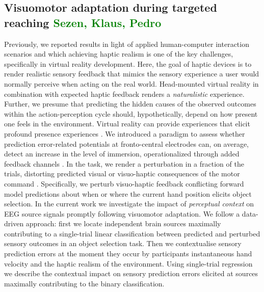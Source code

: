 \subsection{Visuomotor adaptation during targeted reaching \textcolor{green}{Sezen, Klaus, Pedro}}
Previously, we reported results in light of applied human-computer interaction scenarios and which achieving haptic realism is one of the key challenges, specifically in virtual reality development. Here, the goal of haptic devices is to render realistic sensory feedback that mimics the sensory experience a user would normally perceive when acting on the real world. Head-mounted virtual reality in combination with expected haptic feedback renders a \textit{naturalistic} experience. Further, we presume that predicting the hidden causes of the observed outcomes within the action-perception cycle should, hypothetically, depend on how present one feels in the environment. Virtual reality can provide experiences that elicit profound presence experiences \cite{}. We introduced a paradigm to assess whether prediction error-related potentials at fronto-central electrodes can, on average, detect an increase in the level of immersion, operationalized through added feedback channels \cite{Gehrke_2019}. In the task, we render a perturbation in a fraction of the trials, distorting predicted visual or visuo-haptic consequences of the motor command \cite{oddball}. Specifically, we perturb visuo-haptic feedback conflicting forward model predictions about when or where the current hand position elicits object selection. In the current work we investigate the impact of \textit{perceptual context} on EEG source signals promptly following visuomotor adaptation. We follow a data-driven approach: first we locate independent brain sources maximally contributing to a single-trial linear classification between predicted and perturbed sensory outcomes in an object selection task. Then we contextualise sensory prediction errors at the moment they occur by participants instantaneous hand velocity and the haptic realism of the environment. Using single-trial regression we describe the contextual impact on sensory prediction errors elicited at sources maximally contributing to the binary classification.


